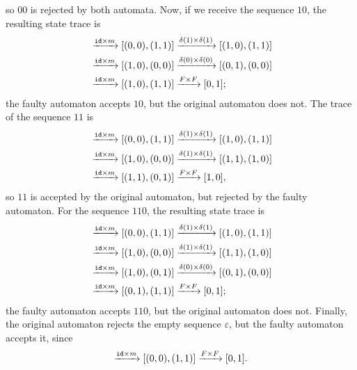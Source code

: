 so $00$ is rejected by both automata. %
Now, if we receive the sequence $10$, the resulting state trace is 
\begin{align*}
    [(0,0),(0,0)]&\xrightarrow{\id\times m}[(0,0),(1,1)]\xrightarrow{\delta(1)\times\delta(1)}[(1,0),(1,1)]\\
   &\xrightarrow{\id\times m}[(1,0),(0,0)]\xrightarrow{\delta(0)\times\delta(0)}[(0,1),(0,0)]\\
   &\xrightarrow{\id\times m}[(1,0),(1,1)]\xrightarrow{F\times F}[0,1];
\end{align*}
the faulty automaton accepts $10$, but the original automaton does not. 
The trace of the sequence $11$ is 
\begin{align*}
    [(0,0),(0,0)]&\xrightarrow{\id\times m}[(0,0),(1,1)]\xrightarrow{\delta(1)\times\delta(1)}[(1,0),(1,1)]\\
   &\xrightarrow{\id\times m}[(1,0),(0,0)]\xrightarrow{\delta(1)\times\delta(1)}[(1,1),(1,0)]\\
   &\xrightarrow{\id\times m}[(1,1),(0,1)]\xrightarrow{F\times F}[1,0],
\end{align*}
so $11$ is accepted by the original automaton, but rejected by the faulty automaton. 
For the sequence $110$, the resulting state trace is 
\begin{align*}
    [(0,0),(0,0)]&\xrightarrow{\id\times m}[(0,0),(1,1)]\xrightarrow{\delta(1)\times\delta(1)}[(1,0),(1,1)]\\
   &\xrightarrow{\id\times m}[(1,0),(0,0)]\xrightarrow{\delta(1)\times\delta(1)}[(1,1),(1,0)]\\
   &\xrightarrow{\id\times m}[(1,0),(0,1)]\xrightarrow{\delta(0)\times\delta(0)}[(0,1),(0,0)]\\
   &\xrightarrow{\id\times m}[(0,1),(1,1)]\xrightarrow{F\times F}[0,1];
\end{align*}
the faulty automaton accepts $110$, but the original automaton does not. Finally, the original automaton rejects the empty sequence $\varepsilon$, but the faulty automaton accepts it, since 
\begin{align*}
    [(0,0),(0,0)]\xrightarrow{\id\times m}[(0,0),(1,1)]\xrightarrow{F\times F}[0,1].
\end{align*} 


